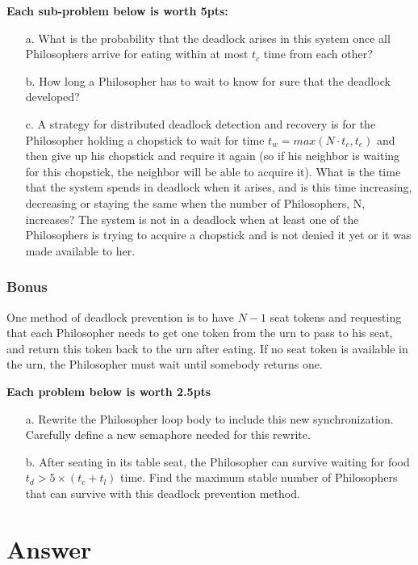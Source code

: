 \documentclass[12pt,letterpaper]{article}
\begin{document}
\textbf{Each sub-problem below is worth 5pts:}
\begin{itemize}
\item[a.] What is the probability that the deadlock arises in this system once all Philosophers
arrive for eating within at most $t_c$ time from each other?
\item[b.] How long a Philosopher has to wait to know for sure that the deadlock developed?
\item[c.] A strategy for distributed deadlock detection and recovery is for the Philosopher
holding a chopstick to wait for time $t_w = max(N\cdot t_c,t_e)$ and then give up his chopstick
and require it again (so if his neighbor is waiting for this chopstick, the neighbor will
be able to acquire it). What is the time that the system spends in deadlock when it
arises, and is this time increasing, decreasing or staying the same when the number
of Philosophers, N, increases? The system is not in a deadlock when at least one of
the Philosophers is trying to acquire a chopstick and is not denied it yet or it was
made available to her.
\end{itemize}

\section*{Bonus}
One method of deadlock prevention is to have $N-1$ seat tokens and requesting that
each Philosopher needs to get one token from the urn to pass to his seat, and
return this token back to the urn after eating. If no seat token is available in the
urn, the Philosopher must wait until somebody returns one.

\textbf{Each problem below is worth 2.5pts}
\begin{itemize}
\item[a.] Rewrite the Philosopher loop body to include this new synchronization. Carefully
define a new semaphore needed for this rewrite.
\item[b.] After seating in its table seat, the Philosopher can survive waiting for food
$t_d > 5\times(t_c+t_l)$ time. Find the maximum stable number of Philosophers that can
survive with this deadlock prevention method.
\end{itemize}

\part*{Answer}
\end{document}
